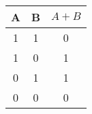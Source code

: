 \documentclass{article}
\begin{document}
\begin{table}[h!]
    \label{tab:table1}
    \centering
    \begin{tabular}{c|c|c}
        \textbf{A} & \textbf{B} & \textbf{$A+B$}\\
        \hline
        1 & 1 & 0\\
        \hline
        1 & 0 & 1\\
        \hline
        0 & 1 & 1\\
        \hline
        0 & 0 & 0\\
    \end{tabular}
\end{table}
\end{document}
